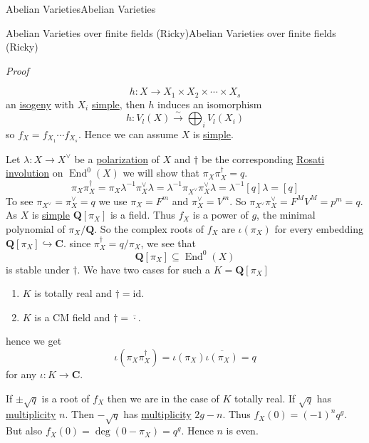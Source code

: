 \documentclass[10pt,]{book}
\makeatletter
\renewcommand*{\proofname}{Proof}
\renewenvironment{proof}[1][\proofname]{\par
  \pushQED{\qed}%
  \normalfont \topsep6\p@\@plus6\p@\relax
  \trivlist
  \item\relax
    {\itshape
    #1\@addpunct{.}}\hspace\labelsep\ignorespaces
}{%
  \popQED\endtrivlist\@endpefalse
}
\numberwithin{equation}{section}
\newcommand{\lb}{[}
\newcommand{\rb}{]}
\newcommand{\QQ}{\mathbf{Q}}
\newcommand{\CC}{\mathbf{C}}
\newcommand{\id}{\mathrm{id}}
\DeclareMathOperator{\End}{End}
\makeatother
\begin{document}
\begin{chapterptx}{Abelian Varieties}{}{Abelian Varieties}{}{}
\begin{sectionptx}{Abelian Varieties over finite fields (Ricky)}{}{Abelian Varieties over finite fields (Ricky)}{}{}
\begin{proof}
\begin{equation*}
h\colon X\to X_1 \times X_2 \times \cdots \times X_s
\end{equation*}
an \hyperref[def-supersing-isog-isog]{isogeny} with \(X_i\) \hyperref[def-simple-av]{simple}, then \(h\) induces an isomorphism%
\begin{equation*}
h\colon V_l(X)\xrightarrow{\sim} \bigoplus_i V_l(X_i)
\end{equation*}
so \(f_X = f_{X_1} \cdots f_{X_s}\). Hence we can assume \(X\) is \hyperref[def-simple-av]{simple}.%
\par
\hypertarget{p-369}{}%
Let \(\lambda \colon X \to X^\vee\) be a \hyperref[def-polarization]{polarization} of \(X\) and \(\dagger\) be the corresponding \hyperref[sec-rosati]{Rosati involution} on \(\End^0(X)\) we will show that \(\pi_X\pi_X^\dagger = q\).%
\begin{equation*}
\pi_X \pi_X^\dagger = \pi_X \lambda^{-1} \pi_X^\vee \lambda = \lambda^{-1} \pi_{X^\vee} \pi_X^\vee \lambda = \lambda^{-1} \lb q \rb \lambda = \lb q \rb
\end{equation*}
To see \(\pi_{X^\vee} = \pi_X^\vee = q\) we use \(\pi_X = F^m\) and \(\pi_X^\vee = V^m \). So \(\pi_{X^\vee} \pi_X^\vee = F^MV^M = p^m = q\). As \(X\) is \hyperref[def-simple-av]{simple} \(\QQ\lb \pi_X\rb\) is a field. Thus \(f_X\) is a power of \(g\), the minimal polynomial of \(\pi_X/\QQ\). So the complex roots of \(f_X\) are \(\iota(\pi_X)\)  for every embedding \(\QQ\lb \pi_X\rb\hookrightarrow \CC\). since \(\pi_X^\dagger = q/ \pi_X\), we see that%
\begin{equation*}
\QQ[\pi_X] \subseteq \End^0(X)
\end{equation*}
is stable under \(\dagger\). We have two cases for such a \(K = \QQ\lb \pi_X \rb \)\leavevmode%
\begin{enumerate}
\item\hypertarget{li-64}{}\(K\) is  totally real and \(\dagger = \id\).%
\item\hypertarget{li-65}{}\(K\) is a CM field and \(\dagger = \overline{\cdot}\).%
\end{enumerate}
hence we get%
\begin{equation*}
\iota(\pi_X\pi_X^\dagger) = \iota(\pi_X) \overline{\iota(\pi_X)} = q
\end{equation*}
for any \(\iota\colon K \to \CC\).%
\par
\hypertarget{p-370}{}%
If \(\pm \sqrt q\) is  a root  of  \(f_X\) then we are in the case of \(K\) totally real. If \(\sqrt q\) has \hyperref[def-riem-order-vanish]{multiplicity} \(n\). Then \(-\sqrt q\) has \hyperref[def-riem-order-vanish]{multiplicity} \(2g-n\). Thus \(f_X(0) = (-1)^n   q^g\). But also \(f_X(0 ) = \deg(0 - \pi_X) = q^g\). Hence \(n \) is even.%

\end{proof}
\end{sectionptx}
\end{chapterptx}
\end{document}
